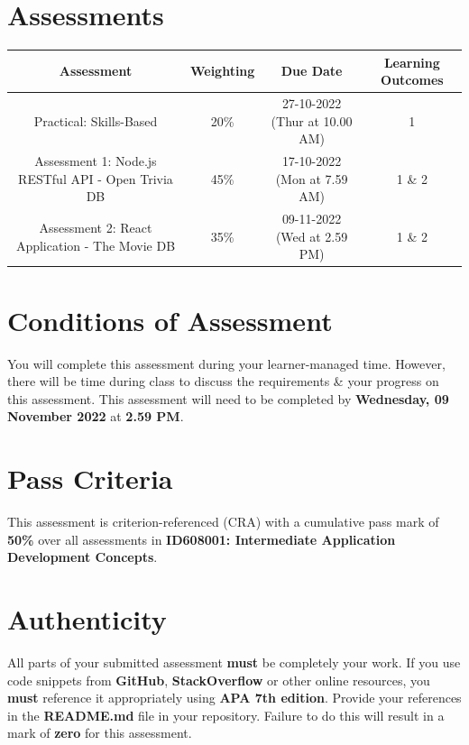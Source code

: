 \documentclass{article}
\begin{document}
\section*{Assessments}
\renewcommand{\arraystretch}{1.5}
\begin{tabular}{|c|c|c|c|}
	\hline
	\textbf{Assessment}                                 & \textbf{Weighting} & \textbf{Due Date}            & \textbf{Learning Outcomes} \\ \hline
	\small Practical: Skills-Based & \small 20\%        & \small 27-10-2022 (Thur at 10.00 AM)   & \small 1                   \\ \hline
	\small Assessment 1: Node.js RESTful API - Open Trivia DB              & \small 45\%        & \small 17-10-2022 (Mon at 7.59 AM)  & \small 1 \& 2                   \\ \hline
	\small Assessment 2: React Application - The Movie DB                       & \small 35\%        & \small 09-11-2022 (Wed at 2.59 PM)  & \small 1 \& 2                   \\ \hline
\end{tabular}

\section*{Conditions of Assessment}
You will complete this assessment during your learner-managed time. However, there will be time during class to discuss the requirements \& your progress on this assessment. This assessment will need to be completed by \textbf{Wednesday, 09 November 2022} at \textbf{2.59 PM}.

\section*{Pass Criteria}
This assessment is criterion-referenced (CRA) with a cumulative pass mark of \textbf{50\%} over all assessments in \textbf{ID608001: Intermediate Application Development Concepts}.

\section*{Authenticity}
All parts of your submitted assessment \textbf{must} be completely your work. If you use code snippets from \textbf{GitHub}, \textbf{StackOverflow} or other online resources, you \textbf{must} reference it appropriately using \textbf{APA 7th edition}. Provide your references in the \textbf{README.md} file in your repository. Failure to do this will result in a mark of \textbf{zero} for this assessment.
\end{document}
